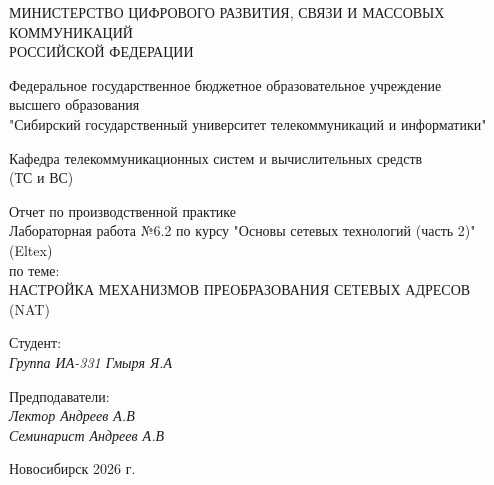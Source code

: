 \thispagestyle{empty}

\begin{center}
    МИНИСТЕРСТВО ЦИФРОВОГО РАЗВИТИЯ, СВЯЗИ И МАССОВЫХ КОММУНИКАЦИЙ \\ РОССИЙСКОЙ ФЕДЕРАЦИИ

    \vspace{20pt}

    Федеральное государственное бюджетное образовательное учреждение  \\  высшего образования \\
    "Сибирский государственный университет телекоммуникаций и информатики" \\

    \vspace{20pt}

    Кафедра телекоммуникационных систем и вычислительных средств \\  (ТС и ВС)
\end{center}

\vfill

\begin{center}
    Отчет по производственной практике \\  
    Лабораторная работа №6.2 по курсу "Основы сетевых технологий (часть 2)" (Eltex) \\
    \vspace{20pt}
    по теме: \\
    \uppercase{Настройка механизмов преобразования сетевых адресов (NAT)}
\end{center}

\vfill

    \noindent Студент: \\
    \textit{Группа ИА-331 \hfill Гмыря Я.А} 

    \vspace{20pt}
 
    \noindent Предподаватели: \\
    \textit{Лектор \hfill Андреев А.В} \\
    \textit{Семинарист \hfill Андреев А.В}

\vfill

\begin{center}
    Новосибирск 2026 г.
\end{center}